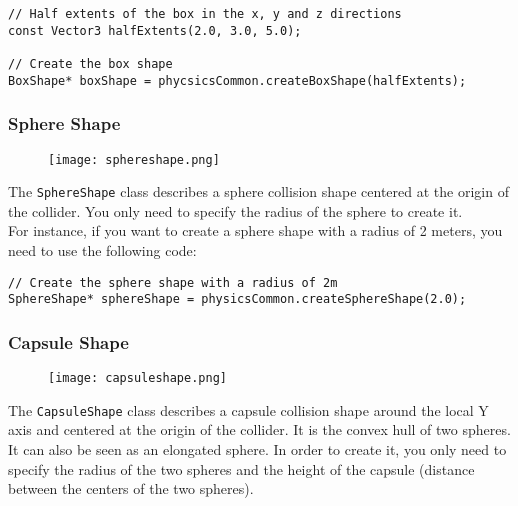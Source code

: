 \documentclass[a4paper,12pt]{article}
\begin{document}
    \begin{lstlisting}
// Half extents of the box in the x, y and z directions
const Vector3 halfExtents(2.0, 3.0, 5.0);

// Create the box shape
BoxShape* boxShape = phycsicsCommon.createBoxShape(halfExtents);
  \end{lstlisting}

    \vspace{0.6cm}

    \subsubsection{Sphere Shape}

    \begin{figure}[h]
        \centering
        \texttt{[image: sphereshape.png]}
        \label{fig:sphereshape}
    \end{figure}

    The \texttt{SphereShape} class describes a sphere collision shape centered at the origin of the collider. You only need to specify the
    radius of the sphere to create it. \\

    For instance, if you want to create a sphere shape with a radius of 2 meters, you need to use the following code: \\

    \begin{lstlisting}
// Create the sphere shape with a radius of 2m
SphereShape* sphereShape = physicsCommon.createSphereShape(2.0);
  \end{lstlisting}

    \vspace{0.6cm}

    \subsubsection{Capsule Shape}

    \begin{figure}[h]
        \centering
        \texttt{[image: capsuleshape.png]}
        \label{fig:capsuleshape}
    \end{figure}

    The \texttt{CapsuleShape} class describes a capsule collision shape around the local Y axis and centered at the origin of the collider.
    It is the convex hull of two spheres. It can also be seen as an elongated sphere. In order to create it, you only need to specify the
    radius of the two spheres and the height of the capsule (distance between the centers of the two spheres).  \\
\end{document}

